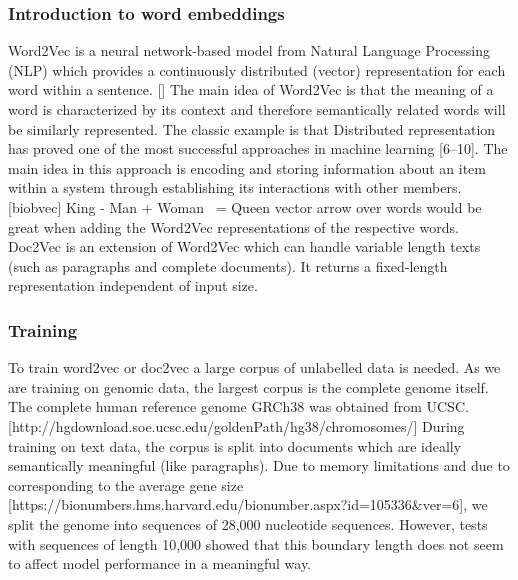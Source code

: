 \subsubsection{Introduction to word embeddings}
Word2Vec is a neural network-based model from Natural Language Processing (NLP) which provides a continuously distributed (vector) representation for each word within a sentence. [] The main idea of Word2Vec is that the meaning of a word is characterized by its context and therefore semantically related words will be similarly represented. The classic example is that
Distributed representation has proved one of the most successful approaches in machine learning [6–10]. The main idea in this approach is encoding and storing information about an item within a system through establishing its interactions with other members. [biobvec]
King - Man + Woman ~= Queen
vector arrow over words would be great
when adding the Word2Vec representations of the respective words.
Doc2Vec is an extension of Word2Vec which can handle variable length texts (such as paragraphs and complete documents). It returns a fixed-length representation independent of input size.
\subsubsection{Training}
To train word2vec or doc2vec a large corpus of unlabelled data is needed. As we are training on genomic data, the largest corpus is the complete genome itself. The complete human reference genome GRCh38 was obtained from UCSC. [http://hgdownload.soe.ucsc.edu/goldenPath/hg38/chromosomes/]
During training on text data, the corpus is split into documents which are ideally semantically meaningful (like paragraphs). Due to memory limitations and due to corresponding to the average gene size [https://bionumbers.hms.harvard.edu/bionumber.aspx?id=105336&ver=6], we split the genome into sequences of 28,000 nucleotide sequences. However, tests with sequences of length 10,000 showed that this boundary length does not seem to affect model performance in a meaningful way.
